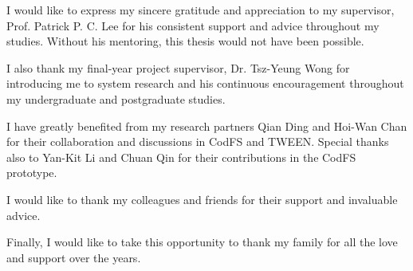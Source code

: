 I would like to express my sincere gratitude and appreciation to my supervisor,
Prof. Patrick P. C. Lee for his consistent support and advice throughout my studies.
Without his mentoring, this thesis would not have been possible.

I also thank my final-year project supervisor, Dr. Tsz-Yeung Wong for introducing me to
system research and his continuous encouragement throughout my undergraduate and
postgraduate studies.

I have greatly benefited from my research partners Qian Ding and Hoi-Wan Chan
for their collaboration and discussions in CodFS and TWEEN. Special thanks also
to Yan-Kit Li and Chuan Qin for their contributions in the CodFS prototype.  

I would like to thank my colleagues and friends for their support and invaluable
advice.

Finally, I would like to take this opportunity to thank my family for all the
love and support over the years.

